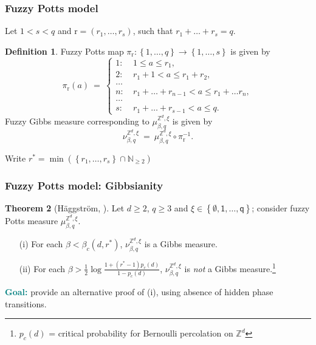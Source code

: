 \documentclass{beamer}
\newcommand{\N}{\mathbb{N}}
\renewcommand{\r}{\mathrm{r}}
\newcommand{\Z}{\mathbb{Z}}
\newcommand{\set}[1]{\left\{#1\right\}}
\newcommand{\ra}{\rightarrow}
\newcommand{\1}{\mathbbm{1}}
\newcommand{\5}{\vspace{0.5cm}}
\newcommand{\3}{\vspace{0.3cm}}
\theoremstyle{definition}
\newtheorem{thm}{Theorem}[section]
\newtheorem{df}[thm]{Definition}
\begin{document}
\begin{frame}
\frametitle{Fuzzy Potts model}
Let $1<s<q$ and $\r=(r_1,\ldots,r_s)$, such that $r_1+\ldots+r_s=q$.\pause
\begin{df}
Fuzzy Potts map $\pi_\r:\set{1,\ldots,q}\ra\set{1,\ldots,s}$ is given by
$$\pi_\r(a) ~=~ \begin{cases}
1: ~&1\leq a\leq r_1, \\
2: ~&r_1+1<a\leq r_1+r_2, \\
\ldots \\
n: ~& r_1+\ldots+r_{n-1}<a\leq r_1+\ldots r_n, \\
\ldots \\
s: ~& r_1+\ldots+r_{s-1}<a\leq q.
\end{cases}$$\pause
Fuzzy Gibbs measure corresponding to $\mu_{\beta,q}^{\Z^d,\xi}$ is given by
$$\nu_{\beta,q}^{\Z^d,\xi} ~=~ \mu_{\beta,q}^{\Z^d,\xi}\circ\pi_{\r}^{-1}.$$
\end{df}
\end{frame}

\begin{frame}
Write $r^*=\min(\set{r_1,\ldots,r_s}\cap\N_{\geq 2})$
\frametitle{Fuzzy Potts model: Gibbsianity}
\begin{thm}[H\"aggstr\"om, \cite{Hag}]
Let $d\geq 2$, $q\geq 3$ and $\xi\in\set{\emptyset,\mathsf{1},\ldots,\mathsf{q}}$; consider fuzzy Potts measure $\mu_{\beta,q}^{\Z^d,\xi}$.\pause
\begin{itemize}
	\item[(i)] For each $\beta<\beta_c(d,r^*)$, $\nu_{\beta,q}^{\Z^d,\xi}$ is a Gibbs measure.\pause
	\item[(ii)] For each $\beta>\frac{1}{2}\log\frac{1+(r^*-1)p_c(d)}{1-p_c(d)}$, $\nu_{\beta,q}^{\Z^d,\xi}$ is \textit{not} a Gibbs measure.\footnote{$p_c(d)$ = critical probability for Bernoulli percolation on $\Z^d$}
\end{itemize}
\end{thm}\vspace{0.3cm}\pause
\textcolor{teal}{\textbf{Goal:}} provide an alternative proof of (i), using absence of hidden phase transitions.
\end{frame}

\end{document}
